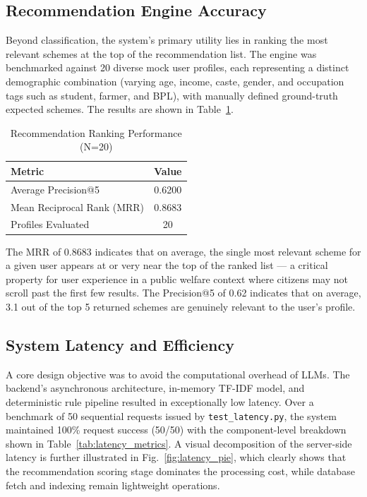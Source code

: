 \documentclass[10pt, journal, twocolumn]{IEEEtran}
\begin{document}
\subsection{Recommendation Engine Accuracy}
Beyond classification, the system's primary utility lies in ranking the most relevant schemes at the top of the recommendation list. The engine was benchmarked against 20 diverse mock user profiles, each representing a distinct demographic combination (varying age, income, caste, gender, and occupation tags such as student, farmer, and BPL), with manually defined ground-truth expected schemes. The results are shown in Table~\ref{tab:recsys_metrics}.

\begin{table}[htbp]
\centering
\caption{Recommendation Ranking Performance (N=20)}
\label{tab:recsys_metrics}
\begin{tabularx}{\linewidth}{@{}X c@{}}
\toprule
\textbf{Metric} & \textbf{Value} \\
\midrule
Average Precision@5 & 0.6200 \\
Mean Reciprocal Rank (MRR) & 0.8683 \\
Profiles Evaluated & 20 \\
\bottomrule
\end{tabularx}
\end{table}

The MRR of 0.8683 indicates that on average, the single most relevant scheme for a given user appears at or very near the top of the ranked list --- a critical property for user experience in a public welfare context where citizens may not scroll past the first few results. The Precision@5 of 0.62 indicates that on average, 3.1 out of the top 5 returned schemes are genuinely relevant to the user's profile.

\subsection{System Latency and Efficiency}
A core design objective was to avoid the computational overhead of LLMs. The backend's asynchronous architecture, in-memory TF-IDF model, and deterministic rule pipeline resulted in exceptionally low latency. Over a benchmark of 50 sequential requests issued by \texttt{test\_latency.py}, the system maintained 100\% request success (50/50) with the component-level breakdown shown in Table~\ref{tab:latency_metrics}. A visual decomposition of the server-side latency is further illustrated in Fig.~\ref{fig:latency_pie}, which clearly shows that the recommendation scoring stage dominates the processing cost, while database fetch and indexing remain lightweight operations.
\end{document}
